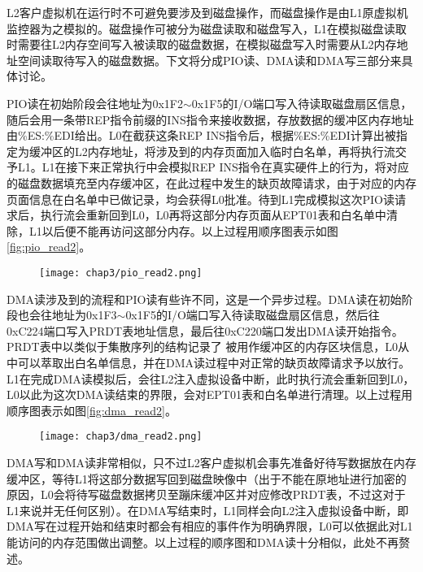 L2客户虚拟机在运行时不可避免要涉及到磁盘操作，而磁盘操作是由L1原虚拟机监控器为之模拟的。磁盘操作可被分为磁盘读取和磁盘写入，L1在模拟磁盘读取时需要往L2内存空间写入被读取的磁盘数据，在模拟磁盘写入时需要从L2内存地址空间读取待写入的磁盘数据。下文将分成PIO读、DMA读和DMA写三部分来具体讨论。

PIO读在初始阶段会往地址为0x1F2$\sim$0x1F5的I/O端口写入待读取磁盘扇区信息，随后会用一条带REP指令前缀的INS指令来接收数据，存放数据的缓冲区内存地址由\%ES:\%EDI给出。L0在截获这条REP INS指令后，根据\%ES:\%EDI计算出被指定为缓冲区的L2内存地址，将涉及到的内存页面加入临时白名单，再将执行流交予L1。L1在接下来正常执行中会模拟REP INS指令在真实硬件上的行为，将对应的磁盘数据填充至内存缓冲区，在此过程中发生的缺页故障请求，由于对应的内存页面信息在白名单中已做记录，均会获得L0批准。待到L1完成模拟这次PIO读请求后，执行流会重新回到L0，L0再将这部分内存页面从EPT01表和白名单中清除，L1以后便不能再访问这部分内存。以上过程用顺序图表示如图\ref{fig:pio_read2}。

\begin{figure}[!htbp]
  \centering
  \texttt{[image: chap3/pio\_read2.png]}
\end{figure}

DMA读涉及到的流程和PIO读有些许不同，这是一个异步过程。DMA读在初始阶段也会往地址为0x1F3$\sim$0x1F5的I/O端口写入待读取磁盘扇区信息，然后往0xC224端口写入PRDT表地址信息，最后往0xC220端口发出DMA读开始指令。PRDT表中以类似于集散序列的结构记录了
被用作缓冲区的内存区块信息，L0从中可以萃取出白名单信息，并在DMA读过程中对正常的缺页故障请求予以放行。L1在完成DMA读模拟后，会往L2注入虚拟设备中断，此时执行流会重新回到L0，L0以此为这次DMA读结束的界限，会对EPT01表和白名单进行清理。以上过程用顺序图表示如图\ref{fig:dma_read2}。

\begin{figure}[!htbp]
  \centering
  \texttt{[image: chap3/dma\_read2.png]}
\end{figure}

DMA写和DMA读非常相似，只不过L2客户虚拟机会事先准备好待写数据放在内存缓冲区，等待L1将这部分数据写回到磁盘映像中（出于不能在原地址进行加密的原因，L0会将待写磁盘数据拷贝至蹦床缓冲区并对应修改PRDT表，不过这对于L1来说并无任何区别）。在DMA写结束时，L1同样会向L2注入虚拟设备中断，即DMA写在过程开始和结束时都会有相应的事件作为明确界限，L0可以依据此对L1能访问的内存范围做出调整。以上过程的顺序图和DMA读十分相似，此处不再赘述。

